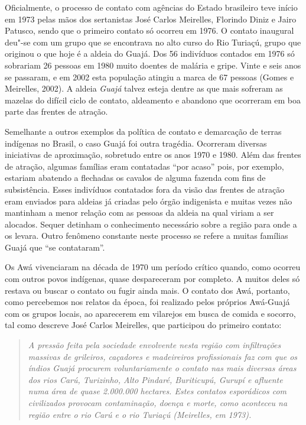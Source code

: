 Oficialmente, o processo de contato com agências do Estado brasileiro
teve início em 1973 pelas mãos dos sertanistas José Carlos Meirelles,
Florindo Diniz e Jairo Patusco, sendo que o primeiro contato só ocorreu
em 1976. O contato inaugural deu"-se com um grupo que se encontrava no
alto curso do Rio Turiaçú, grupo que originou o que hoje é a aldeia do
 Guajá. Dos 56 indivíduos contados em 1976 só sobrariam 26 pessoas em
1980 muito doentes de malária e gripe. Vinte e seis anos se passaram, e
em 2002 esta população atingiu a marca de 67 pessoas (Gomes e Meirelles,
2002). A aldeia \emph{Guajá} talvez esteja dentre as que mais sofreram
as mazelas do difícil ciclo de contato, aldeamento e abandono que
ocorreram em boa parte das frentes de atração.

Semelhante a outros exemplos da política de contato e demarcação de
terras indígenas no Brasil, o caso Guajá foi outra tragédia. Ocorreram
diversas iniciativas de aproximação, sobretudo entre os anos 1970 e
1980. Além das frentes de atração, algumas famílias eram contatadas
``por acaso'' pois, por exemplo, estariam abatendo a flechadas os
cavalos de alguma fazenda com fins de subsistência. Esses indivíduos
contatados fora da visão das frentes de atração eram enviados para
aldeias já criadas pelo órgão indigenista e muitas vezes não mantinham a
menor relação com as pessoas da aldeia na qual viriam a ser alocados.
Sequer detinham o conhecimento necessário sobre a região para onde a
 os levara. Outro fenômeno constante neste processo se refere a
muitas famílias Guajá que ``se contataram''.

Os Awá vivenciaram na década de 1970 um período crítico quando, como
ocorreu com outros povos indígenas, quase despareceram por completo. A
muitos deles só restava ou buscar o contato ou fugir ainda mais. O
contato dos Awá, portanto, como percebemos nos relatos da época, foi
realizado pelos próprios Awá-Guajá com os grupos locais, ao aparecerem
em vilarejos em busca de comida e socorro, tal como descreve José Carlos
Meirelles, que participou do primeiro contato:

\begin{quote}
\emph{A pressão feita pela sociedade envolvente nesta região com infiltrações
massivas de grileiros, caçadores e madeireiros profissionais faz com que
os índios Guajá procurem voluntariamente o contato nas mais diversas
áreas dos rios Carú, Turizinho, Alto Pindaré, Buriticupú, Gurupí e
afluente numa área de quase 2.000.000 hectares. Estes contatos
esporádicos com civilizados provocam contaminação, doença e morte, como
aconteceu na região entre o rio Carú e o rio Turiaçú (Meirelles, em
1973).}
\end{quote}

